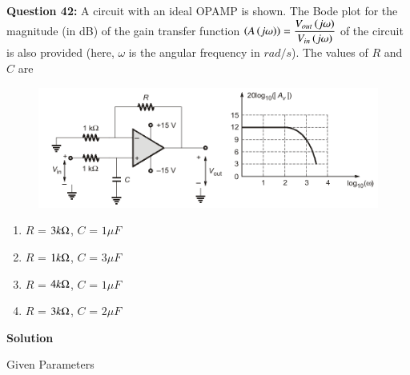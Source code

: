 \documentclass[journal,12pt,twocolumn]{IEEEtran}
\theoremstyle{remark}
\begin{document}
%
\textbf{Question 42:}
 A circuit with an ideal OPAMP is shown. The Bode plot for the magnitude (in dB)
 of the gain transfer function $ \left(A \left(j \omega\right)\right) = \dfrac{ V_{out}\left(j \omega\right)}{V_{in}\left(j \omega\right)}$ of the circuit is also
provided (here, $\omega$ is the angular frequency in $ rad/s $). The values of $R$ and $C$ are 
\begin{figure}[ht]
	\centering
    \includegraphics[width=\columnwidth]{figs/fig1.png}
    \label{fig: 1}
\end{figure}
\begin{enumerate}[label = (\Alph*)]
     \item $R$ = $3k\ohm$,  $C$ = $1\mu F$\\
     \item $R$ = $1k\ohm$,  $C$ = $3\mu F$\\
     \item $R$ = $4k\ohm$,  $C$ = $1\mu F$\\
     \item $R$ = $3k\ohm$,  $C$ = $2\mu F$\\
\end{enumerate}
\textbf{Solution}

\begin{table}[!h]
	\centering
	
	\vspace{6 pt}
	\caption{Given Parameters}
	\label{tab:enter-label}
\end{table}
\end{document}
